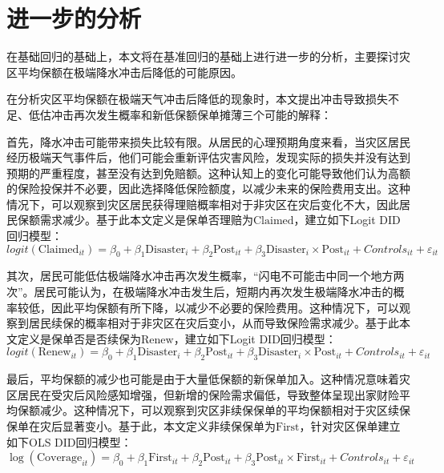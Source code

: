 \chapter{进一步的分析}\label{chap:4.1}
在基础回归的基础上，本文将在基准回归的基础上进行进一步的分析，主要探讨灾区平均保额在极端降水冲击后降低的可能原因。

在分析灾区平均保额在极端天气冲击后降低的现象时，本文提出冲击导致损失不足、低估冲击再次发生概率和新低保额保单摊薄三个可能的解释：

首先，降水冲击可能带来损失比较有限。从居民的心理预期角度来看，当灾区居民经历极端天气事件后，他们可能会重新评估灾害风险，发现实际的损失并没有达到预期的严重程度\citep{谢晓非2012心理台风眼效应研究综述,王大伟2014先前情绪和过度自信对灾难事件后继风险决策的影响}，甚至没有达到免赔额。这种认知上的变化可能导致他们认为高额的保险投保并不必要，因此选择降低保险额度，以减少未来的保险费用支出。这种情况下，可以观察到灾区居民获得理赔概率相对于非灾区在灾后变化不大，因此居民保额需求减少。基于此本文定义是保单否理赔为$\text{Claimed}$，建立如下Logit DID回归模型：
\begin{equation}
    logit(\text{Claimed}_{it}) =\beta_0 +\beta_1 \text{Disaster}_i+\beta_2\text{Post}_{it}+\beta_3\text{Disaster}_i \times \text{Post}_{it} + Controls_{it}+ \varepsilon_{it}
    \label{eq:1}
\end{equation}

其次，居民可能低估极端降水冲击再次发生概率，“闪电不可能击中同一个地方两次”。居民可能认为，在极端降水冲击发生后，短期内再次发生极端降水冲击的概率较低\citep{szollosi2019simultaneous}，因此平均保额有所下降，以减少不必要的保险费用。这种情况下，可以观察到居民续保的概率相对于非灾区在灾后变小，从而导致保险需求减少。基于此本文定义是保单否是否续保为$\text{Renew}$，建立如下Logit DID回归模型：
\begin{equation}
    logit(\text{Renew}_{it}) =\beta_0 +\beta_1 \text{Disaster}_i+\beta_2\text{Post}_{it}+\beta_3\text{Disaster}_i \times \text{Post}_{it} + Controls_{it}+ \varepsilon_{it}
    \label{eq:2}
\end{equation}

最后，平均保额的减少也可能是由于大量低保额的新保单加入。这种情况意味着灾区居民在受灾后风险感知增强，但新增的保险需求偏低，导致整体呈现出家财险平均保额减少。这种情况下，可以观察到灾区非续保保单的平均保额相对于灾区续保保单在灾后显著变小。基于此，本文定义非续保保单为$\text{First}$，针对灾区保单建立如下OLS DID回归模型：
\begin{equation}\label{eq:3}
    \log(\text{Coverage}_{it}) =\beta_0 + \beta_1 \text{First}_{it} + \beta_2 \text{Post}_{it}+\beta_3 \text{Post}_{it} \times \text{First}_{it} + Controls_{it}+ \varepsilon_{it}
\end{equation}

